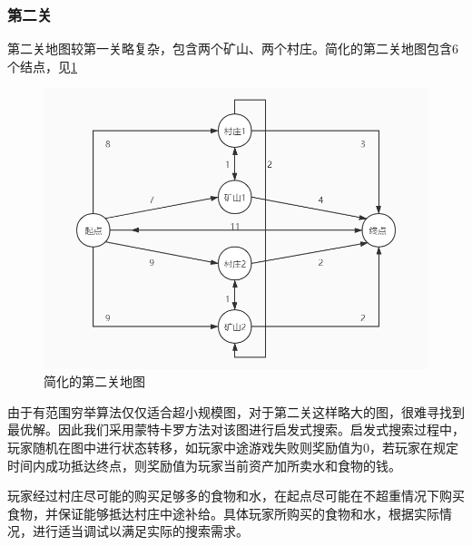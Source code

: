 \documentclass[withoutpreface,bwprint]{cumcmthesis} %
\begin{document}
\subsubsection{第二关}
第二关地图较第一关略复杂，包含两个矿山、两个村庄。简化的第二关地图包含6个结点，见\cref{fig:map2}
\begin{figure}[H]
	\centering
	\includegraphics[scale=0.5]{figures/map2.jpg}
	\caption{简化的第二关地图}
	\label{fig:map2}
\end{figure}
由于有范围穷举算法仅仅适合超小规模图，对于第二关这样略大的图，很难寻找到最优解。因此我们采用蒙特卡罗方法对该图进行启发式搜索。启发式搜索过程中，玩家随机在图中进行状态转移，如玩家中途游戏失败则奖励值为0，若玩家在规定时间内成功抵达终点，则奖励值为玩家当前资产加所卖水和食物的钱。

玩家经过村庄尽可能的购买足够多的食物和水，在起点尽可能在不超重情况下购买食物，并保证能够抵达村庄中途补给。具体玩家所购买的食物和水，根据实际情况，进行适当调试以满足实际的搜索需求。
\end{document}

